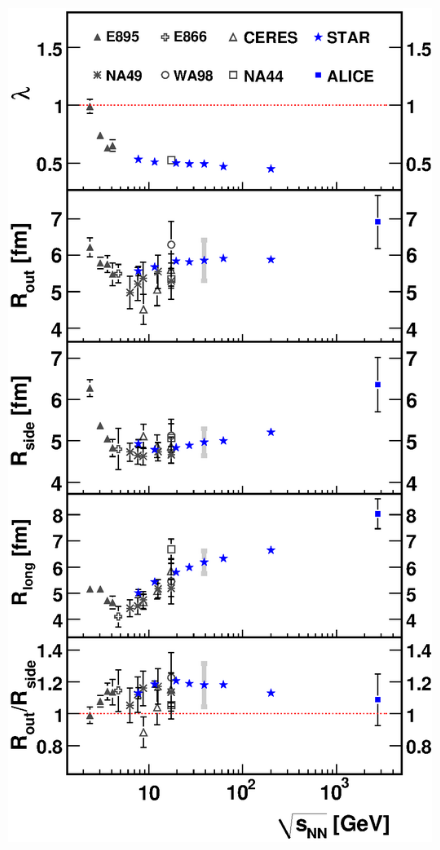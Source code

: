 \documentclass[dvipsnames] {beamer}
\begin{document}
\begin{frame}
{\begin{columns}[t]
\begin{block}{\bf {}}
\begin{figure}[H]
                           \includegraphics[width=1.\linewidth]{RiRootS.eps}
                         \end{figure}
                       \end{block}
                     \end{columns}
}
\end{frame}
\end{document}
